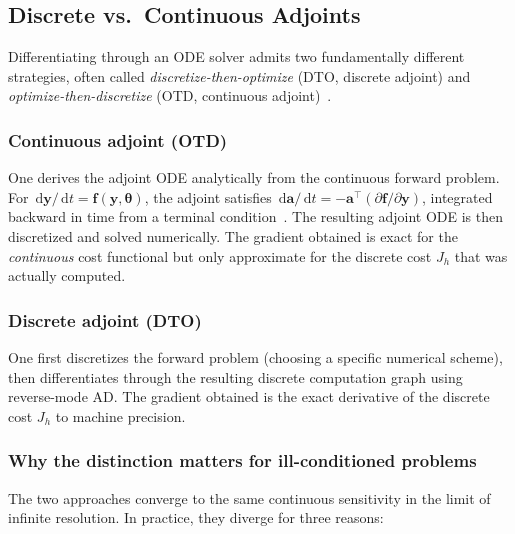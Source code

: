 \documentclass[11pt,a4paper]{article}
\newcommand{\vect}[1]{\bm{#1}}
\newcommand{\dd}{\,\mathrm{d}}
\theoremstyle{definition}
\begin{document}
\subsection{Discrete vs.\ Continuous Adjoints}\label{sec:disc-vs-cont}

Differentiating through an ODE solver admits two fundamentally different
strategies, often called \emph{discretize-then-optimize} (DTO, discrete
adjoint) and \emph{optimize-then-discretize} (OTD, continuous
adjoint)~\cite{giles2000}.

\subsubsection{Continuous adjoint (OTD)}

One derives the adjoint ODE analytically from the continuous forward
problem.  For $\dd\vect{y}/\dd t = \vect{f}(\vect{y}, \vect{\theta})$,
the adjoint satisfies
$\dd\vect{a}/\dd t = -\vect{a}^\top (\partial\vect{f}/\partial\vect{y})$,
integrated backward in time from a terminal
condition~\cite{pontryagin1962,chen2018neural}.  The resulting adjoint
ODE is then discretized and solved numerically.  The gradient obtained
is exact for the \emph{continuous} cost functional but only approximate
for the discrete cost $J_h$ that was actually computed.

\subsubsection{Discrete adjoint (DTO)}

One first discretizes the forward problem (choosing a specific numerical
scheme), then differentiates through the resulting discrete computation
graph using reverse-mode AD.  The gradient obtained is the exact
derivative of the discrete cost $J_h$ to machine precision.

\subsubsection{Why the distinction matters for ill-conditioned problems}

The two approaches converge to the same continuous sensitivity in the
limit of infinite resolution.  In practice, they diverge for three
reasons:
\end{document}
